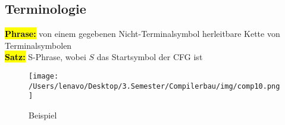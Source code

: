 \documentclass[a4paper, 10pt]{article}
\begin{document}
\subsection{Terminologie}
\textbf{\hl{Phrase:}} von einem gegebenen Nicht-Terminalsymbol herleitbare Kette von Terminalsymbolen\\[3mm]
\textbf{\hl{Satz:}} S-Phrase, wobei $S$ das Startsymbol der CFG ist
\begin{figure}[h]
    \centering
    \texttt{[image: /Users/lenavo/Desktop/3.Semester/Compilerbau/img/comp10.png]}
    \caption{Beispiel}
    \label{fig:enter-label}
\end{figure}
\end{document}
